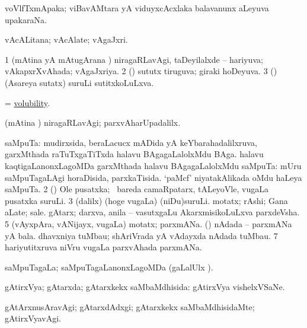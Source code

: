 \bentry 
{} 
\gl{\nA}
\expl{}
\bmng
 voVlfTxmApaka; viBavAMtara yA viduyxcAcxlaka balavanunx aLeyuva upakaraNa. 
\emng
\eentry

\bentry
{} 
\gl{\nA}
\expl{}
\bmng
 vAcALitana; vAcAlate; vAgaJxri. 
\emng
\eentry

\bentry
{} 
\gl{\gu}
\expl{}
\bmng
\bnum
\num{1} (mAtina yA mAtugArana \vi) niragaRLavAgi, taDeyilalxde -- hariyuva; vAkapxrXvAhada; vAgaJxriya. 
\num{2} (\pArxparx) sututx tiruguva; giraki hoDeyuva. 
\num{3} (\savi) (Asareya sutatx) suruLi sutitxkoLuLxva. 
\enum
\emng
\eentry

\bentry 
{} 
\gl{\nA}
\expl{}
\bmng
 = \hyperlink{volubility}{volubility}. 
\emng
\eentry

\bentry
{} 
\gl{\kirxvi}
\expl{}
\bmng
 (mAtina \vi) niragaRLavAgi; parxvAharUpadalilx. 
\emng
\eentry

\bentry 
{} 
\gl{\nA}
\expl{}
\bmng
\bnum
{} saMpuTa: 
\banum
{} mudirxsida, beraLacucx mADida yA keYbarahadalilxruva, garxMthada raTuTxgaTiTxda halavu BAgagaLalolxMdu BAga. 
 halavu kaqtigaLanonxLagoMDa garxMthada halavu BAgagaLalolxMdu saMpuTa:  mUru saMpuTagaLAgi horaDisida, parxkaTisida.  `paMcf' niyatakAlikada oMdu haLeya saMpuTa. 
\eanum
\numie
\num{2} (\ca) Ole pusatxka; \sA\ bareda camaRpatarx, tALeyoVle, \mo vugaLa pusatxka suruLi. 
\num{3} (\bava dalilx) (hoge \mo vugaLa) (niDu)suruLi. 
\banum
{} motatx; rAshi; Gana aLate; sale. 
 gAtarx; darxva, anila -- vasutxgaLu AkarxmisikoLuLxva parxdeVsha. 
\eanum
\numie
\num{5} (vAyxpAra, vANijayx, \mo vugaLa) motatx; parxmANa. 
 (\saM) 
\banum
{} nAdada -- parxmANa yA bala. 
 dhavxniya tuMbau; shAriVrada yA vAdayxda nAdada tuMbau. 
\eanum
\numie
\num{7} hariyutitxruva niVru \mo vugaLa parxvAhada parxmANa. 
\enum
\emng
\eentry

\bentry
{} 
\gl{\gu}
\expl{}
\bmng
 saMpuTagaLa; saMpuTagaLanonxLagoMDa (\saMpa gaLalUlx \parx). 
\emng
\eentry

\bentry 
{} 
\gl{\gu}
\expl{}
\bmng
 gAtirxVya; gAtarxda; gAtarxkekx saMbaMdhisida:  gAtirxVya vishelxVSaNe. 
\emng
\eentry

\bentry
{} 
\gl{\kirxvi}
\expl{}
\bmng
 gAtArxnusAravAgi; gAtarxdAdxgi; gAtarxkekx saMbaMdhisidaMte; gAtirxVyavAgi. 
\emng
\eentry

